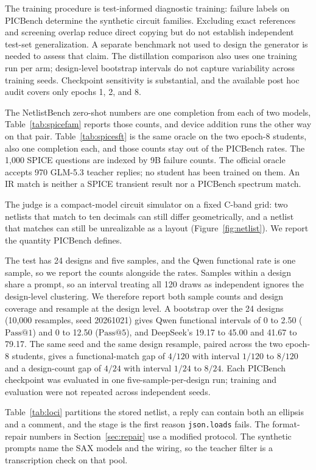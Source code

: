 \documentclass[11pt]{article}
\makeatletter
\newcommand{\passk}[1]{\mathrm{Pass@}#1}
\makeatother
\begin{document}
The training procedure is test-informed diagnostic training: failure labels on PICBench determine the synthetic circuit families. Excluding exact references and screening overlap reduce direct copying but do not establish independent test-set generalization. A separate benchmark not used to design the generator is needed to assess that claim. The distillation comparison also uses one training run per arm; design-level bootstrap intervals do not capture variability across training seeds. Checkpoint sensitivity is substantial, and the available post hoc audit covers only epochs 1, 2, and 8.

The NetlistBench zero-shot numbers are one completion from each of two models, Table~\ref{tab:spicefam} reports those counts, and device addition runs the other way on that pair.
Table~\ref{tab:spicesft} is the same oracle on the two epoch-8 students, also one completion each, and those counts stay out of the PICBench rates.
The 1{,}000 SPICE questions are indexed by 9B failure counts. The official oracle accepts 970 GLM-5.3 teacher replies; no student has been trained on them. An IR match is neither a SPICE transient result nor a PICBench spectrum match.

The judge is a compact-model circuit simulator on a fixed C-band grid: two netlists that match to ten decimals can still differ geometrically, and a netlist that matches can still be unrealizable as a layout (Figure~\ref{fig:netlist}).
We report the quantity PICBench defines.

The test has 24 designs and five samples, and the Qwen functional rate is one sample, so we report the counts alongside the rates.
Samples within a design share a prompt, so an interval treating all 120 draws as independent ignores the design-level clustering. We therefore report both sample counts and design coverage and resample at the design level.
A bootstrap over the 24 designs (10{,}000 resamples, seed 20261021) gives Qwen functional intervals of 0 to 2.50 ($\passk{1}$) and 0 to 12.50 ($\passk{5}$), and DeepSeek's 19.17 to 45.00 and 41.67 to 79.17.
The same seed and the same design resample, paired across the two epoch-8 students, gives a functional-match gap of $4/120$ with interval $1/120$ to $8/120$ and a design-count gap of $4/24$ with interval $1/24$ to $8/24$.
Each PICBench checkpoint was evaluated in one five-sample-per-design run; training and evaluation were not repeated across independent seeds.

Table~\ref{tab:loci} partitions the stored netlist, a reply can contain both an ellipsis and a comment, and the stage is the first reason \texttt{json.loads} fails.
The format-repair numbers in Section~\ref{sec:repair} use a modified protocol.
The synthetic prompts name the SAX models and the wiring, so the teacher filter is a transcription check on that pool.
\end{document}
